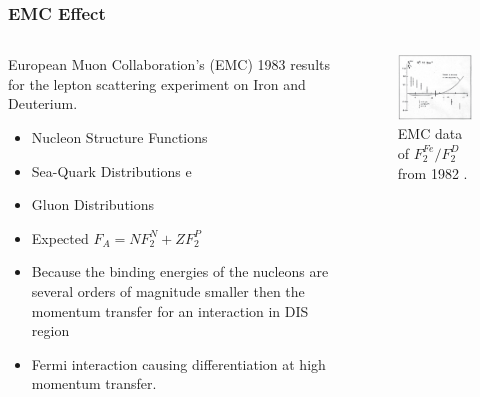 \documentclass{beamer}
\begin{document}
\begin{frame}
\frametitle{EMC Effect}

	\begin{columns}[c] %

		\vspace{-10pt}
		\begin{block}{}
			European Muon Collaboration's (EMC) 1983  results for the lepton scattering experiment on Iron and Deuterium. 
			\begin{itemize}
				\item Nucleon Structure Functions
				\item Sea-Quark Distributions 
			e	\item Gluon Distributions 
				\item Expected $ F_A = NF_2^N + ZF_2^P $
				\item Because the binding energies of the nucleons are several orders of magnitude smaller then the momentum transfer for an interaction in DIS region
				\item Fermi interaction causing differentiation at high momentum transfer.
			\end{itemize}
		\end{block}

	
		\begin{figure}
			\caption{\label{EMC} EMC data of $ F_2^{Fe}/F_2^{D}$  from 1982 \cite{cc}.}
	 		\includegraphics[width =5.5cm]{../images/EMC_cc.jpg}
	 	\end{figure}
 	\end{columns}
\end{frame}
\end{document}
